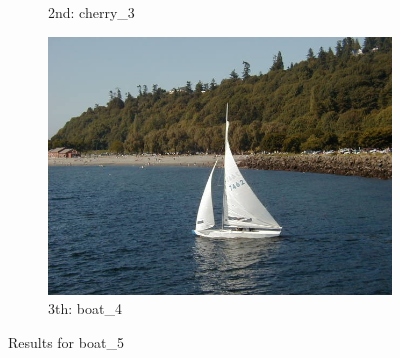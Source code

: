 \documentclass[10pt, a4paper]{article}
\begin{document}
\begin{itemize}
\begin{figure}[H]
\begin{subfigure}{0.25\textwidth}
        \caption{2nd: cherry\_3}
    \end{subfigure}%
    \begin{subfigure}{0.25\textwidth}
	  \centering
	  \includegraphics[width=0.9\linewidth]{../input/boat_4.jpg}
	    \caption{3th: boat\_4}
	\end{subfigure}
    \caption{Results for boat\_5}
    \label{fig:results_boat_5}
\end{figure}


\end{itemize}
\end{document}
